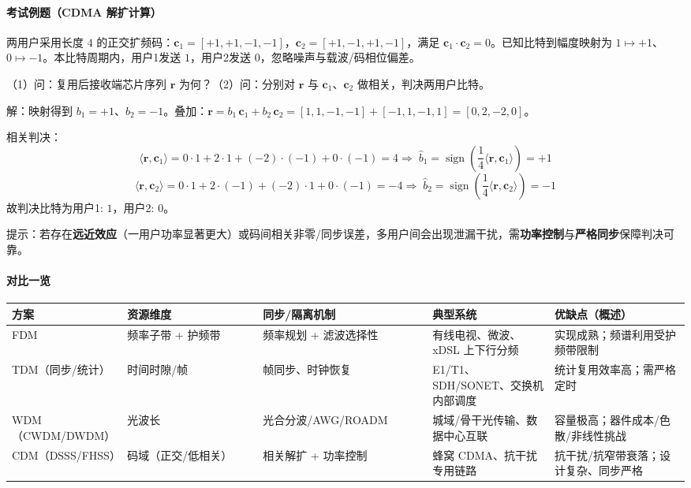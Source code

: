 \documentclass[lang=cn,newtx,10pt,scheme=chinese]{../../elegantbook}
\begin{document}
\paragraph{考试例题（CDMA 解扩计算）}
两用户采用长度 $4$ 的正交扩频码：$\mathbf{c}_1=[+1,+1,-1,-1]$，$\mathbf{c}_2=[+1,-1,+1,-1]$，满足 $\mathbf{c}_1\cdot\mathbf{c}_2=0$。已知比特到幅度映射为 $1\mapsto +1$、$0\mapsto -1$。本比特周期内，用户1发送 $1$，用户2发送 $0$，忽略噪声与载波/码相位偏差。

（1）问：复用后接收端芯片序列 $\mathbf{r}$ 为何？（2）问：分别对 $\mathbf{r}$ 与 $\mathbf{c}_1$、$\mathbf{c}_2$ 做相关，判决两用户比特。

解：映射得到 $b_1=+1$、$b_2=-1$。叠加：$\mathbf{r}=b_1\,\mathbf{c}_1+b_2\,\mathbf{c}_2=[1,1,-1,-1]+[-1,1,-1,1]=[0,2,-2,0]$。

相关判决：
\[
\langle\mathbf{r},\mathbf{c}_1\rangle=0\cdot1+2\cdot1+(-2)\cdot(-1)+0\cdot(-1)=4\Rightarrow \;\hat b_1=\operatorname{sign}\!\left(\dfrac{1}{4}\langle\mathbf{r},\mathbf{c}_1\rangle\right)=+1
\]
\[
\langle\mathbf{r},\mathbf{c}_2\rangle=0\cdot1+2\cdot(-1)+(-2)\cdot1+0\cdot(-1)=-4\Rightarrow \;\hat b_2=\operatorname{sign}\!\left(\dfrac{1}{4}\langle\mathbf{r},\mathbf{c}_2\rangle\right)=-1
\]
故判决比特为用户1: $1$，用户2: $0$。

提示：若存在\textbf{远近效应}（一用户功率显著更大）或码间相关非零/同步误差，多用户间会出现泄漏干扰，需\textbf{功率控制}与\textbf{严格同步}保障判决可靠。

\paragraph{对比一览}
{\small\begin{longtable}{|p{0.17\linewidth}|p{0.20\linewidth}|p{0.25\linewidth}|p{0.18\linewidth}|p{0.20\linewidth}|}
\hline
	\textbf{方案} & \textbf{资源维度} & \textbf{同步/隔离机制} & \textbf{典型系统} & \textbf{优缺点（概述）} \\
\hline
FDM & 频率子带 + 护频带 & 频率规划 + 滤波选择性 & 有线电视、微波、xDSL 上下行分频 & 实现成熟；频谱利用受护频带限制 \\
\hline
TDM（同步/统计） & 时间时隙/帧 & 帧同步、时钟恢复 & E1/T1、SDH/SONET、交换机内部调度 & 统计复用效率高；需严格定时 \\
\hline
WDM（CWDM/DWDM） & 光波长 & 光合分波/AWG/ROADM & 城域/骨干光传输、数据中心互联 & 容量极高；器件成本/色散/非线性挑战 \\
\hline
CDM（DSSS/FHSS） & 码域（正交/低相关） & 相关解扩 + 功率控制 & 蜂窝 CDMA、抗干扰专用链路 & 抗干扰/抗窄带衰落；设计复杂、同步严格 \\
\hline
\end{longtable}}
\end{document}
